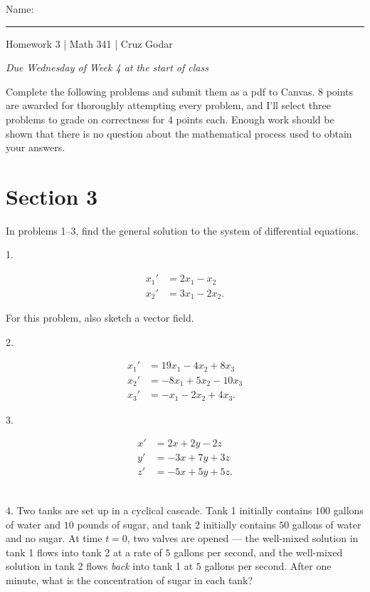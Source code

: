 \documentclass{article}
\begin{document}
\Large Name: \rule{2in}{0.15mm} \hfill Homework 3 | Math 341 | Cruz Godar \vspace{4pt} \normalsize

\textit{Due Wednesday of Week 4 at the start of class}

Complete the following problems and submit them as a pdf to Canvas. 8 points are awarded for thoroughly attempting every problem, and I'll select three problems to grade on correctness for 4 points each. Enough work should be shown that there is no question about the mathematical process used to obtain your answers.

\section{Section 3}

In problems 1--3, find the general solution to the system of differential equations.

1.

\begin{align*}
	x_1' &= 2x_1 - x_2\\
	x_2' &= 3x_1 - 2x_2.
\end{align*}

For this problem, also sketch a vector field.

2.

\begin{align*}
	x_1' &= 19x_1 - 4x_2 + 8x_3\\
	x_2' &= -8x_1 + 5x_2 - 10x_3\\
	x_3' &= -x_1 - 2x_2 + 4x_3.
\end{align*}

3.

\begin{align*}
	x' &= 2x + 2y - 2z\\
	y' &= -3x + 7y + 3z\\
	z' &= -5x + 5y + 5z.
\end{align*}

~\\

4. Two tanks are set up in a cyclical cascade. Tank 1 initially contains $100$ gallons of water and $10$ pounds of sugar, and tank 2 initially contains $50$ gallons of water and no sugar. At time $t = 0$, two valves are opened --- the well-mixed solution in tank 1 flows into tank 2 at a rate of $5$ gallons per second, and the well-mixed solution in tank 2 flows \textit{back} into tank 1 at $5$ gallons per second. After one minute, what is the concentration of sugar in each tank?
\end{document}
